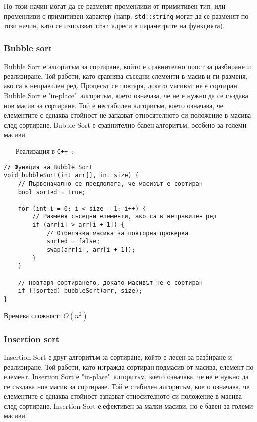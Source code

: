 \documentclass[oneside]{book}
\newcommand*{\code}[1]{\texttt{#1}}
\newcommand*{\cpp}{\texttt{C++}\ }
\begin{document}
По този начин могат да се разменят променливи от примитивен тип, или променливи с примитивен характер (напр. \code{std::string} могат да се разменят по този начин, като се използват \code{char} адреси в параметрите на функцията).
\pagebreak
\subsubsection{Bubble sort}
Bubble Sort е алгоритъм за сортиране, който е сравнително прост за разбиране и реализиране.
Той работи, като сравнява съседни елементи в масив и ги разменя, ако са в неправилен ред.
Процесът се повтаря, докато масивът не е сортиран.
Bubble Sort е "in-place"\ алгоритъм, което означава, че не е нужно да се създава нов масив за сортиране.
Той е нестабилен алгоритъм, което означава, че елементите с еднаква стойност не запазват относителното си положение в масива след сортиране.
Bubble Sort е сравнително бавен алгоритъм, особено за големи масиви.

\begin{itemize}\item[Реализация] в \cpp:\end{itemize}
\begin{mdframed}\begin{lstlisting}
// Функция за Bubble Sort
void bubbleSort(int arr[], int size) {
    // Първоначално се предполага, че масивът е сортиран
    bool sorted = true;

    for (int i = 0; i < size - 1; i++) {
        // Разменя съседни елементи, ако са в неправилен ред
        if (arr[i] > arr[i + 1]) {
            // Отбелязва масива за повторна проверка
            sorted = false;
            swap(arr[i], arr[i + 1]);
        }
    }

    // Повтаря сортирането, докато масивът не е сортиран
    if (!sorted) bubbleSort(arr, size);
}
\end{lstlisting}\end{mdframed}

Времева сложност: $O(n^2)$
\pagebreak
\subsubsection{Insertion sort}
Insertion Sort е друг алгоритъм за сортиране, който е лесен за разбиране и реализиране.
Той работи, като изгражда сортиран подмасив от масива, елемент по елемент.
Insertion Sort е "in-place"\ алгоритъм, което означава, че не е нужно да се създава нов масив за сортиране.
Той е стабилен алгоритъм, което означава, че елементите с еднаква стойност запазват относителното си положение в масива след сортиране.
Insertion Sort е ефективен за малки масиви, но е бавен за големи масиви.
\end{document}
